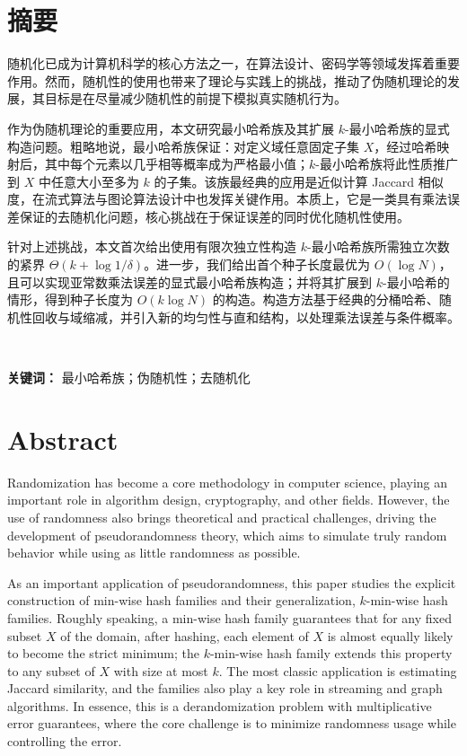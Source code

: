 \section*{摘要}

随机化已成为计算机科学的核心方法之一，在算法设计、密码学等领域发挥着重要作用。然而，随机性的使用也带来了理论与实践上的挑战，推动了伪随机理论的发展，其目标是在尽量减少随机性的前提下模拟真实随机行为。

作为伪随机理论的重要应用，本文研究最小哈希族及其扩展 $k$-最小哈希族的显式构造问题。粗略地说，最小哈希族保证：对定义域任意固定子集 $X$，经过哈希映射后，其中每个元素以几乎相等概率成为严格最小值；$k$-最小哈希族将此性质推广到 $X$ 中任意大小至多为 $k$ 的子集。该族最经典的应用是近似计算 Jaccard 相似度，在流式算法与图论算法设计中也发挥关键作用。本质上，它是一类具有乘法误差保证的去随机化问题，核心挑战在于保证误差的同时优化随机性使用。

针对上述挑战，本文首次给出使用有限次独立性构造 $k$-最小哈希族所需独立次数的紧界 $\Theta(k + \log 1/\delta)$。进一步，我们给出首个种子长度最优为 $O(\log N)$，且可以实现亚常数乘法误差的显式最小哈希族构造；并将其扩展到 $k$-最小哈希的情形，得到种子长度为 $O(k \log N)$ 的构造。构造方法基于经典的分桶哈希、随机性回收与域缩减，并引入新的均匀性与直和结构，以处理乘法误差与条件概率。

\

\noindent \textbf{关键词：}
最小哈希族；伪随机性；去随机化

\newpage

\section*{ Abstract}

Randomization has become a core methodology in computer science, playing an important role in algorithm design, cryptography, and other fields. However, the use of randomness also brings theoretical and practical challenges, driving the development of pseudorandomness theory, which aims to simulate truly random behavior while using as little randomness as possible.

As an important application of pseudorandomness, this paper studies the explicit construction of min-wise hash families and their generalization, $k$-min-wise hash families. Roughly speaking, a min-wise hash family guarantees that for any fixed subset $X$ of the domain, after hashing, each element of $X$ is almost equally likely to become the strict minimum; the $k$-min-wise hash family extends this property to any subset of $X$ with size at most $k$. The most classic application is estimating Jaccard similarity, and the families also play a key role in streaming and graph algorithms. In essence, this is a derandomization problem with multiplicative error guarantees, where the core challenge is to minimize randomness usage while controlling the error.


